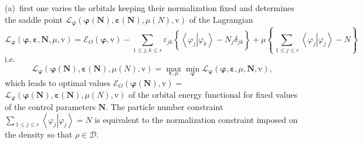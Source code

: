 \documentclass[aps,preprint]{revtex4}%
\begin{document}
(a)\ first one varies the orbitals keeping their normalization fixed and
determines the saddle point $\mathcal{L}_{\boldsymbol{\varphi}}\left(
\boldsymbol{\varphi}\left(  \boldsymbol{N}\right)  ,\boldsymbol{\varepsilon
}\left(  \boldsymbol{N}\right)  ,\mu\left(  N\right)  ,\mathrm{v}\right)  $ of
the Lagrangian
\begin{equation}
\mathcal{L}_{\boldsymbol{\varphi}}\left(  \boldsymbol{\varphi}%
,\boldsymbol{\varepsilon,N,}\mu\boldsymbol{,}\mathrm{v}\right)  =\mathcal{E}%
_{O}\left(  \boldsymbol{\varphi,}\mathrm{v}\right)  -\sum_{1\leq j,k\leq
r}\varepsilon_{jk}\left\{  \overset{\,}{\left\langle \left.  \varphi
_{j}\right\vert \varphi_{k}\right\rangle -N_{j}\delta_{jk}}\right\}
+\mu\left\{  \sum_{\,1\leq j\leq r}\left\langle \left.  \varphi_{j}\right\vert
\varphi_{j}\right\rangle -N\right\}  \label{OrbLag}%
\end{equation}
i.e.
\begin{equation}
\mathcal{L}_{\boldsymbol{\varphi}}\left(  \boldsymbol{\varphi}\left(
\boldsymbol{N}\right)  ,\boldsymbol{\varepsilon}\left(  \boldsymbol{N}\right)
,\mu\left(  N\right)  ,\mathrm{v}\right)  =\max_{\boldsymbol{\varepsilon,}\mu
}\min_{\boldsymbol{\varphi}}\mathcal{L}_{\boldsymbol{\varphi}}\left(
\boldsymbol{\varphi},\boldsymbol{\varepsilon},\mu\boldsymbol{,N,}%
\mathrm{v}\right)  , \label{KSM1}%
\end{equation}
which leads to optimal values $\mathcal{E}_{O}\left(  \boldsymbol{\varphi
}\left(  \boldsymbol{N}\right)  \boldsymbol{,}\mathrm{v}\right)  =$
$\mathcal{L}_{\boldsymbol{\varphi}}\left(  \boldsymbol{\varphi}\left(
\boldsymbol{N}\right)  ,\boldsymbol{\varepsilon}\left(  \boldsymbol{N}\right)
,\mu\left(  N\right)  \boldsymbol{,}\mathrm{v}\right)  $ of the orbital energy
functional for fixed values of the control parameters $\boldsymbol{N}$. The
particle number constraint $\sum_{\,1\leq j\leq r}\left\langle \left.
\varphi_{j}\right\vert \varphi_{j}\right\rangle =N$ is equivalent to the
normalization constraint imposed on the density so that $\rho\in\mathcal{D}$.
\end{document}
